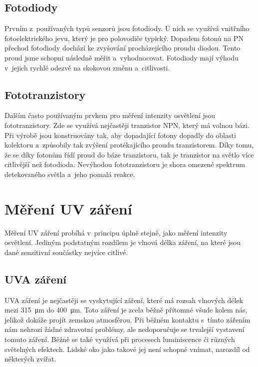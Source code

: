 \subsection{Fotodiody}

Prvním z~používaných typů senzorů jsou fotodiody. U nich se využívá vnitřního fotoelektrického jevu, který je pro polovodiče typický. Dopadem fotonů na PN přechod fotodiody dochází ke zvyšování procházejícího proudu diodou. Tento proud jsme schopni následně měřit a~vyhodnocovat. Fotodiody mají výhodu v~jejich rychlé odezvě na skokovou změnu a~citlivosti.

\subsection{Fototranzistory}

Dalším často používaným prvkem pro měření intenzity osvětlení jsou fototranzistory. Zde se využívá nejčastěji tranzistor NPN, který má volnou bázi. Při výrobě jsou konstruovány tak, aby dopadající fotony dopadly do oblasti kolektoru a~způsobily tak zvýšení protékajícího proudu tranzistorem. Díky tomu, že se díky fotonům řídí proud do báze tranzistoru, tak je tranzistor na světlo více citlivější než fotodioda. Nevýhodou fototranzistoru je shora omezené spektrum detekovaného světla a~jeho pomalá reakce.

\section{Měření UV záření}

Měření UV záření probíhá v~principu úplně stejně, jako měření intenzity osvětlení. Jediným podstatným rozdílem je vlnová délka záření, na které jsou dané senzitivní součástky nejvíce citlivé. 

\subsection{UVA záření}

UVA záření je nejčastěji se vyskytující záření, které má rozsah vlnových délek mezi \SI{315}{\micro\metre} do \SI{400}{\micro\metre}. Toto záření je zcela běžně přítomné všude kolem nás, jelikož dokáže projít zemskou atmosférou. Při běžném kontaktu s~tímto zářením nám nehrozí žádné zdravotní problémy, ale nedoporučuje se trvalejší vystavení tomuto záření. Běžně se také využívá při procesech luminiscence či různých světelných efektech. Lidské oko jako takové jej není schopné vnímat, narozdíl od některých zvířat.

